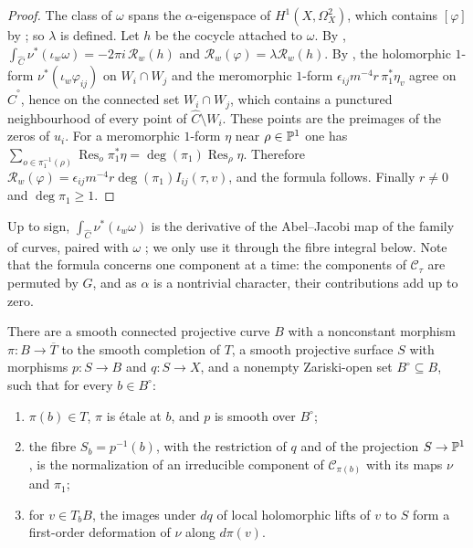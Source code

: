 \begin{proof}
The class of $\omega$ spans the $\alpha$-eigenspace of $H^{1}(X,
\Omega^{2}_{X})$, which contains $[\varphi]$ by ; so
$\lambda$ is defined. Let $h$ be the cocycle attached to $\omega$. By
, $\int_{\widehat C}\nu^{*}(\iota_{w}\omega)=-2\pi i\,
\mathcal R_{w}(h)$ and $\mathcal R_{w}(\varphi)=\lambda\mathcal R_{w}(h)$. By
, the holomorphic $1$-form $\nu^{*}(\iota_{w}
\varphi_{ij})$ on $W_{i}\cap W_{j}$ and the meromorphic $1$-form
$\epsilon_{ij}m^{-4}r\,\pi_{1}^{*}\eta_{v}$ agree on $\widehat C^{\circ}$, hence
on the connected set $W_{i}\cap W_{j}$, which contains a punctured
neighbourhood of every point of $\widehat C\setminus W_{i}$. These points are
the preimages of the zeros of $u_{i}$. For a meromorphic $1$-form $\eta$
near $\rho\in\mathbb{P}^{1}$ one has $\sum_{o\in\pi_{1}^{-1}(\rho)}\operatorname{Res}_{o}
\pi_{1}^{*}\eta=\deg(\pi_{1})\operatorname{Res}_{\rho}\eta$. Therefore
$\mathcal R_{w}(\varphi)=\epsilon_{ij}m^{-4}r\deg(\pi_{1})I_{ij}(\tau,v)$,
and the formula follows. Finally $r\ne0$ and $\deg\pi_{1}\ge1$.
\end{proof}

Up to sign, $\int_{\widehat C}\nu^{*}(\iota_{w}\omega)$ is the derivative of
the Abel--Jacobi map of the family of curves, paired with $\omega$
\cite{CG80}; we only use it through the fibre integral below. Note that the
formula concerns one component at a time: the components of
$\mathcal C_{\tau}$ are permuted by $G$, and as $\alpha$ is a nontrivial
character, their contributions add up to zero.

\begin{lemma}\label{lem:familygen}
There are a smooth connected projective curve $B$ with a nonconstant
morphism $\pi\colon B\to\overline T$ to the smooth completion of $T$, a
smooth projective surface $S$ with morphisms $p\colon S\to B$ and $q\colon
S\to X$, and a nonempty Zariski-open set $B^{\circ}\subseteq B$, such that
for every $b\in B^{\circ}$:
\begin{enumerate}[label=\textup{(\roman*)}]
\item $\pi(b)\in T$, $\pi$ is \'etale at $b$, and $p$ is smooth over
$B^{\circ}$;
\item the fibre $S_{b}=p^{-1}(b)$, with the restriction of $q$ and of the
projection $S\to\mathbb{P}^{1}$, is the normalization of an irreducible component
of $\mathcal C_{\pi(b)}$ with its maps $\nu$ and $\pi_{1}$;
\item for $v\in T_{b}B$, the images under $dq$ of local holomorphic lifts of
$v$ to $S$ form a first-order deformation of $\nu$ along $d\pi(v)$.
\end{enumerate}
\end{lemma}

